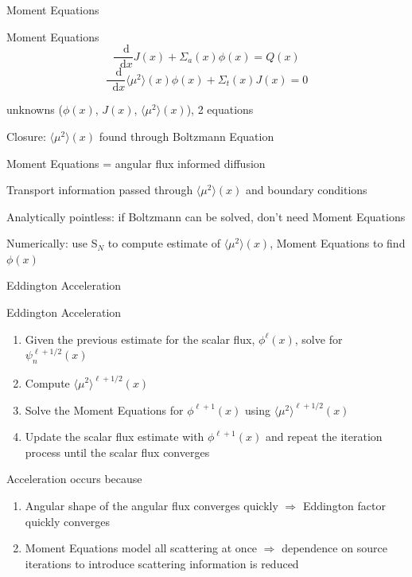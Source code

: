 \documentclass[10pt,draft]{beamer}
\newcommand{\SN}{S$_N$\xspace}
\newcommand{\ud}{\mathop{}\!\mathrm{d}} %
\newcommand{\dderiv}[2]{\frac{\ud #1}{\ud #2}}
\newcommand{\edd}{\langle \mu^2 \rangle}
\begin{document}
\begin{frame}{Moment Equations}

	\begin{block}{Moment Equations}
	\begin{equation*}
		\dderiv{}{x} J(x) + \Sigma_a(x) \phi(x) = Q(x) \tag{\footnotesize Zeroth Moment}
	\end{equation*}
	\begin{equation*}
		\dderiv{}{x} \edd(x) \phi(x) 
		+ \Sigma_t(x) J(x) = 0 
		\tag{\footnotesize First Moment}
	\end{equation*}
	\end{block}

	 unknowns ($\phi(x)$, $J(x)$, $\edd(x)$), 2 equations 

	\pause 
	Closure: $\edd(x)$ found through Boltzmann Equation  

	\pause
	Moment Equations = angular flux informed diffusion

	\pause
	Transport information passed through $\edd(x)$ and boundary conditions


	\pause 
	Analytically pointless: if Boltzmann can be solved, don't need Moment Equations 

	\pause 
	Numerically: use \SN to compute estimate of $\edd(x)$, Moment Equations to find $\phi(x)$

\end{frame}

\begin{frame}{Eddington Acceleration}

	\begin{exampleblock}{Eddington Acceleration}
	\begin{enumerate}
		\item Given the previous estimate for the scalar flux, $\phi^{\ell}(x)$, solve for $\psi_n^{\ell+1/2}(x)$

		\item \alert{Compute $\edd^{\ell+1/2}(x)$ }

		\item \alert{Solve the Moment Equations for $\phi^{\ell+1}(x)$ 
			using $\edd^{\ell+1/2}(x)$} 

		\item Update the scalar flux estimate with $\phi^{\ell+1}(x)$ and repeat the iteration process until the scalar flux converges
	\end{enumerate}
	\end{exampleblock}

	\pause
	Acceleration occurs because
	\begin{enumerate}
		\item Angular shape of the angular flux converges quickly $\Rightarrow$ Eddington factor quickly converges 

		\item Moment Equations model all scattering at once $\Rightarrow$ dependence on source iterations to introduce scattering information is reduced 

	\end{enumerate}

\end{frame}
\end{document}
